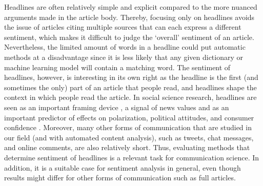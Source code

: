 Headlines are often relatively simple and explicit compared to the more nuanced arguments made in the article body. 
Thereby, focusing only on headlines avoids the issue of articles citing multiple sources that can each express a different sentiment, which makes it difficult to judge the `overall' sentiment of an article.
Nevertheless, the limited amount of words in a headline could put automatic methods at a disadvantage since it is less likely that any given dictionary or machine learning model will contain a matching word.
The sentiment of headlines, however, is interesting in its own right as the headline is the first (and sometimes the only) part of an article that people read, and headlines shape the context in which people read the article. 
In social science research, headlines are seen as an important framing device \citep[e.g.][]{tankard01,liu19}, 
a signal of news values \citep[e.g.][]{ng20} and as an important predictor of effects on polarization, political attitudes, and consumer confidence \citep[e.g.][]{munger20,narayan17,blood95}.
Moreover, many other forms of communication that are studied in our field (and with automated content analysis), such as tweets, chat messages, and online comments, are also relatively short.
Thus, evaluating methods that determine sentiment of headlines is a relevant task for communication science.
In addition, it is a suitable case for sentiment analysis in general,
even though results might differ for other forms of communication such as full articles.




